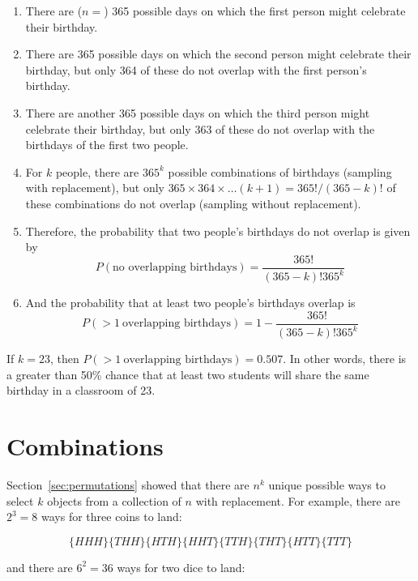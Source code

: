 \begin{enumerate}
\item There are ($n=$) 365 possible days on which the first person might
  celebrate their birthday.
\item There are 365 possible days on which the second person might
  celebrate their birthday, but only 364 of these do not overlap with
  the first person's birthday.
\item There are another 365 possible days on which the third person
  might celebrate their birthday, but only 363 of these do not overlap
  with the birthdays of the first two people.
\item For $k$ people, there are $365^k$ possible combinations of
  birthdays (sampling with replacement), but only
  $365\times{364}\times{\ldots}(k+1) = 365!/(365-k)!$ of these combinations
  do not overlap (sampling without replacement).
\item Therefore, the probability that two people's birthdays do
  not overlap is given by
  \[
  P(\mbox{no overlapping birthdays}) = \frac{365!}{(365-k)!365^k}
  \]
\item And the probability that at least two people's birthdays
  overlap is
  \[
  P(>1~\mbox{overlapping birthdays}) = 1 - \frac{365!}{(365-k)!365^k}
  \]  
\end{enumerate}

If $k = 23$, then $P(>1~\mbox{overlapping birthdays}) = 0.507$. In
other words, there is a greater than 50\% chance that at least two
students will share the same birthday in a classroom of 23.

\section{Combinations}
\label{sec:combinations}

Section~\ref{sec:permutations} showed that there are $n^k$ unique
possible ways to select $k$ objects from a collection of $n$ with
replacement. For example, there are $2^3=8$ ways for three coins to
land:

\[\{HHH\}\{THH\}\{HTH\}\{HHT\}\{TTH\}\{THT\}\{HTT\}\{TTT\}\]

\noindent and there are $6^2=36$ ways for two dice to land:

